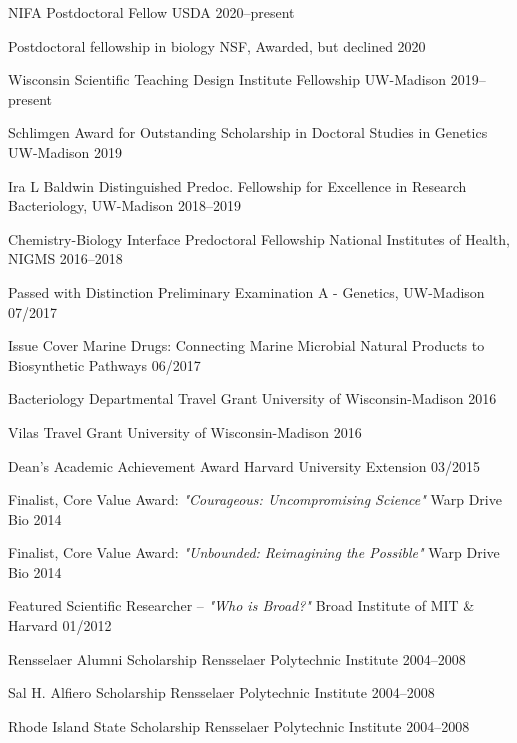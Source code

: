 \begin{cvhonors}

\cvhonor
{NIFA Postdoctoral Fellow}
{USDA}
{2020--present}

\cvhonor
{Postdoctoral fellowship in biology}
{NSF, Awarded, but declined}
{2020}

\cvhonor
{Wisconsin Scientific Teaching Design Institute Fellowship}
{UW-Madison}
{2019--present}

\cvhonor
{Schlimgen Award for Outstanding Scholarship in Doctoral Studies in Genetics}
{UW-Madison}
{2019}

\cvhonor
{Ira L Baldwin Distinguished Predoc. Fellowship for Excellence in Research}
{Bacteriology, UW-Madison}
{2018--2019}

\cvhonor
{Chemistry-Biology Interface Predoctoral Fellowship}
{National Institutes of Health, NIGMS}
{2016--2018}

\cvhonor
{Passed with Distinction}
{Preliminary Examination A - Genetics, UW-Madison}
{07/2017}

\cvhonor
{Issue Cover}
{Marine Drugs: Connecting Marine Microbial Natural Products to Biosynthetic Pathways}
{06/2017}

\cvhonor
{Bacteriology Departmental Travel Grant}
{University of Wisconsin-Madison}
{2016}

\cvhonor
{Vilas Travel Grant}
{University of Wisconsin-Madison}
{2016}

\cvhonor
{Dean's Academic Achievement Award}
{Harvard University Extension}
{03/2015}

\end{cvhonors} \begin{cvhonors}

\cvhonor
{Finalist, Core Value Award: \textit{"Courageous: Uncompromising Science"}}
{Warp Drive Bio}
{2014}

\cvhonor
{Finalist, Core Value Award: \textit{"Unbounded: Reimagining the Possible"}}
{Warp Drive Bio}
{2014}

\cvhonor
{Featured Scientific Researcher -- \textit{"Who is Broad?"}}
{Broad Institute of MIT \& Harvard}
{01/2012}

\cvhonor
{Rensselaer Alumni Scholarship}
{Rensselaer Polytechnic Institute}
{2004--2008}

\cvhonor
{Sal H. Alfiero Scholarship}
{Rensselaer Polytechnic Institute}
{2004--2008}

\cvhonor
{Rhode Island State Scholarship}
{Rensselaer Polytechnic Institute}
{2004--2008}

\end{cvhonors}
